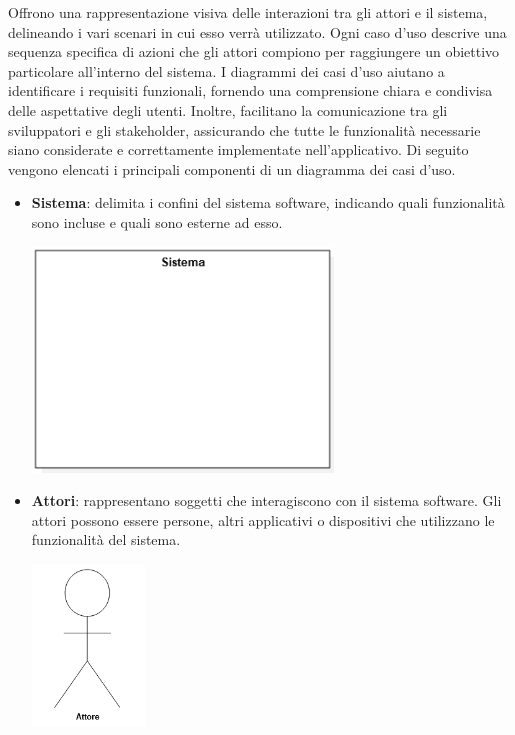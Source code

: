 Offrono una rappresentazione visiva delle interazioni tra gli attori e il sistema, delineando i vari scenari in cui esso verrà utilizzato. Ogni caso d'uso descrive una sequenza specifica di azioni che gli attori compiono per raggiungere un obiettivo particolare all'interno del sistema. I diagrammi dei casi d'uso aiutano a identificare i requisiti funzionali, fornendo una comprensione chiara e condivisa delle aspettative degli utenti. Inoltre, facilitano la comunicazione tra gli sviluppatori e gli stakeholder, assicurando che tutte le funzionalità necessarie siano considerate e correttamente implementate nell'applicativo.
Di seguito vengono elencati i principali componenti di un diagramma dei casi d'uso.
\begin{itemize}
	\item \textbf{Sistema}: delimita i confini del sistema software, indicando quali funzionalità sono incluse e quali sono esterne ad esso.
		\begin{center}
			\includegraphics*[width=8cm]{../../../images/norme_di_progetto/sistema.png}
		\end{center}
	\item \textbf{Attori}: rappresentano soggetti che interagiscono con il sistema software. Gli attori possono essere persone, altri applicativi o dispositivi che utilizzano le funzionalità del sistema.
		\begin{center}
			\includegraphics*[width=3cm]{../../../images/norme_di_progetto/attore.png}

\end{center}
\end{itemize}
